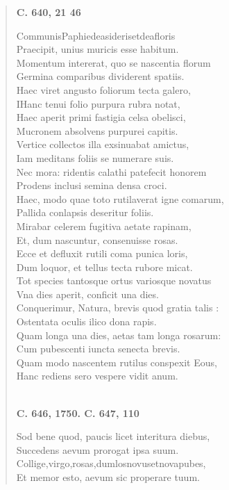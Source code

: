 \documentclass[11pt, a4paper]{report}
\begin{document}
\begin{verse}
    \begin{center} \textbf{C. 640, 21 46} \end{center} \marginpar{[114]} CommunisPaphiedeasiderisetdeafloris \\ Praecipit, unius muricis esse habitum. \\ Momentum intererat, quo se nascentia florum \\ Germina comparibus dividerent spatiis. \\ Haec viret angusto foliorum tecta galero, \\ IHanc tenui folio purpura rubra notat, \\ Haec aperit primi fastigia celsa obelisci, \\ Mucronem absolvens purpurei capitis. \\ Vertice collectos illa exsinuabat amictus, \\ Iam meditans foliis se numerare suis. \\ Nec mora: ridentis calathi patefecit honorem \\ Prodens inclusi semina densa croci. \\ Haec, modo quae toto rutilaverat igne comarum, \\ Pallida conlapsis deseritur foliis. \\ Mirabar celerem fugitiva aetate rapinam, \\ Et, dum nascuntur, consenuisse rosas. \\ Ecce et defluxit rutili coma punica loris, \\ Dum loquor, et tellus tecta rubore micat. \\ Tot species tantosque ortus variosque novatus \\ Vna dies aperit, conficit una dies. \\ Conquerimur, Natura, brevis quod gratia  \lbrack talis \rbrack : \\ Ostentata oculis ilico dona rapis. \\ Quam longa una dies, aetas tam longa rosarum: \\ Cum pubescenti iuncta senecta brevis. \\ Quam modo nascentem rutilus conspexit Eous, \\ Hanc rediens sero vespere vidit anum. \\ 
        ﻿\pagebreak 
    \begin{center} \textbf{C. 646, 1750. C. 647, 110} \end{center} \marginpar{[115]} Sod bene quod, paucis licet interitura diebus, \\ Succedens aevum prorogat ipsa suum. \\ Collige,virgo,rosas,dumlosnovusetnovapubes, \\ Et memor esto, aevum sic properare tuum. \\ 
      \end{verse}
  
\end{document}
